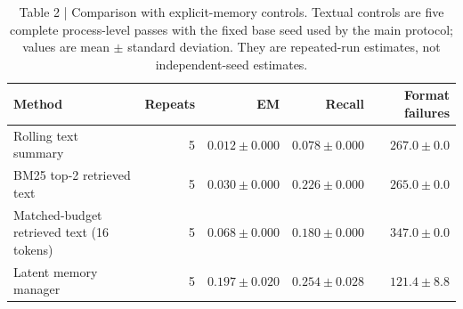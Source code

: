 \begin{table}[t]
\centering
\begin{tabular}{lrrrr}
\toprule
Method & Repeats & EM & Recall & Format failures \\
\midrule
Rolling text summary & 5 & $0.012\pm0.000$ & $0.078\pm0.000$ & $267.0\pm0.0$ \\
BM25 top-2 retrieved text & 5 & $0.030\pm0.000$ & $0.226\pm0.000$ & $265.0\pm0.0$ \\
Matched-budget retrieved text (16 tokens) & 5 & $0.068\pm0.000$ & $0.180\pm0.000$ & $347.0\pm0.0$ \\
Latent memory manager & 5 & \textbf{$0.197\pm0.020$} & \textbf{$0.254\pm0.028$} & \textbf{$121.4\pm8.8$} \\
\bottomrule
\end{tabular}
\caption{Table 2 | Comparison with explicit-memory controls. Textual controls are five complete process-level passes with the fixed base seed used by the main protocol; values are mean $\pm$ standard deviation. They are repeated-run estimates, not independent-seed estimates.}
\label{tab:explicit-memory-comparisons}
\end{table}
